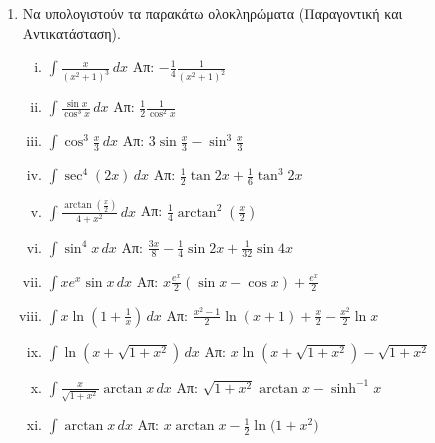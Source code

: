 


\everymath{\displaystyle}
\thispagestyle{askhseis}



\begin{center}
\minibox{\large\bfseries \textcolor{Col1}{Ολοκληρώματα}}
\end{center}

\vspace{\baselineskip}

\begin{enumerate}
	\item Να υπολογιστούν τα παρακάτω ολοκληρώματα (Παραγοντική και
		Αντικατάσταση).

		\begin{enumerate}[i)]
			\item $ \int \frac{x}{(x^{2} + 1)^{3}}  \,{dx} $  \hfill Απ: $ -
				\frac{1}{4} \frac{1}{(x^{2}+1)^{2}} $
			\item $ \int \frac{\sin{x}}{\cos^{3}{x}} \,{dx} $  \hfill Απ: $
				\frac{1}{2} \frac{1}{\cos^{2}{x}} $
			\item $ \int \cos^{3}{\frac{x}{3}} \,{dx} $ \hfill Απ: $ 3
				\sin{\frac{x}{3}} - \sin^{3}{\frac{x}{3}} $
			\item $ \int \sec^{4}(2x) \,{dx}$  \hfill Απ: $ \frac{1}{2} \tan{2x} +
				\frac{1}{6} \tan^{3}{2x}  $\
			\item $ \int \frac{\arctan(\frac{x}{2})}{4+x^{2}} \,{dx} $  
        \hfill Απ: $ \frac{1}{4}
				\arctan^{2}\left(\frac{x}{2}\right) $
			\item $ \int \sin^{4}x \,{dx} $  \hfill Απ: $ \frac{3x}{8} -
				\frac{1}{4} \sin{2x} + \frac{1}{32} \sin{4x} $
			\item $ \int xe^{x} \sin{x}\,{dx}  $  \hfill Απ: $ x \frac{e^{x}}{2}
				(\sin{x} - \cos{x}) + \frac{e^{x}}{2} $
			\item $ \int x \ln(1 + \frac{1}{x}) \,{dx} $ \hfill Απ: $ \frac{x^{2} - 1}{2}
				\ln{(x+1)} + \frac{x}{2} - \frac{x^{2}}{2} \ln{x} $
			\item $ \int \ln{(x + \sqrt{1+x^{2}})} \,{dx} $ \hfill Απ: $ x \ln{(x +
				\sqrt{1 + x^{2}})} - \sqrt{1 + x^{2}}  $
			\item $ \int \frac{x}{\sqrt{1 + x^{2}}} \arctan x \,{dx} $ \hfill Απ: $
				\sqrt{1 + x^{2}} \arctan x - \sinh^{-1}{x}  $
			\item $ \int \arctan x \,{dx} $ \hfill Απ: $ x \arctan x - \frac{1}{2}
				\ln{(1 + x^{2}})  $
		\end{enumerate}



\end{enumerate}
